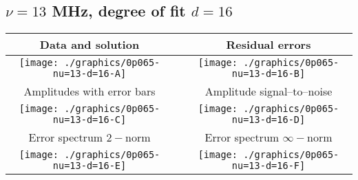 

% 

\clearpage{}
\break{}

\subsection{$\nu = 13$ MHz, degree of fit $d = 16$}

\begin{table}[h]
    \begin{center}
        \begin{tabular}{ccc}
            Data and solution & \quad & Residual errors \\\hline
            \texttt{[image: ./graphics/0p065-nu=13-d=16-A]} &&
            \texttt{[image: ./graphics/0p065-nu=13-d=16-B]} \\[15pt]
            Amplitudes with error bars && Amplitude signal--to--noise \\\hline
            \texttt{[image: ./graphics/0p065-nu=13-d=16-C]} &&
            \texttt{[image: ./graphics/0p065-nu=13-d=16-D]} \\[15pt]
            Error spectrum $2-$norm && Error spectrum $\infty-$norm \\\hline
            \texttt{[image: ./graphics/0p065-nu=13-d=16-E]} &&
            \texttt{[image: ./graphics/0p065-nu=13-d=16-F]} \\[15pt]
        \end{tabular}
    \end{center}
\label{fig:elev=65, nu=13}
\end{table}



\endinput
